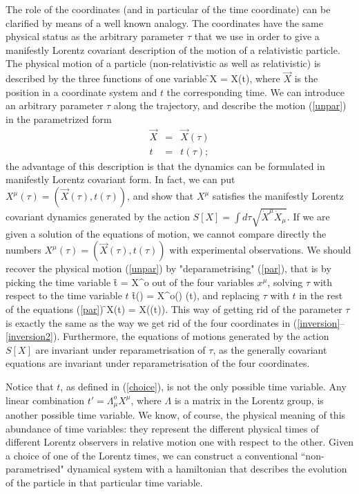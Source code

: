 The role of the coordinates (and in particular of the time
coordinate) can be clarified by means of a well known analogy.
The coordinates have the
same physical status as the arbitrary parameter $\tau$ that we
use in order to give a manifestly Lorentz covariant description of
the motion of a relativistic particle.  The physical motion of a
particle (non-relativistic as well as relativistic) is described by
the three functions of one variable
\f
	\vec X = \vec X(t),				\label{unpar}
\ff
where $\vec X$ is the position in a coordinate system and $t$
the corresponding time.   We can introduce an arbitrary parameter
$\tau$ along the trajectory, and describe the motion (\ref{unpar})
in the parametrized form
\begin{eqnarray}
	\vec X & = & \vec X(\tau)	  		\nonumber \\
	t & = & t(\tau);				\label{par}
\end{eqnarray}
the advantage of this description is that the dynamics can be
formulated in manifestly Lorentz covariant form.  In fact, we can
put $X^\mu(\tau)= (\vec X(\tau), t(\tau))$, and show that $X^\mu$
satisfies the manifestly Lorentz covariant dynamics generated by
the action $S[X]=\int d\tau \sqrt{\dot X^\mu \dot X_\mu}$.   If we
are given a solution of the equations of motion, we cannot
compare directly the numbers $X^\mu(\tau)= (\vec X(\tau),
t(\tau))$ with experimental observations.  We should recover the
physical motion (\ref{unpar}) by "deparametrising" (\ref{par}),
that is by picking the time variable
\f
	t = X^o						\label{choice}
\ff
out of the four variables $x^\mu$, solving $\tau$ with respect to
the time variable $t$
\f
	t(\tau) = X^o(\tau) \rightarrow \tau(t),
\ff
and replacing $\tau$ with $t$ in the rest of the equations
(\ref{par})
\f
	\vec X(t) = \vec X(\tau(t)).
\ff
This way of getting rid of the parameter $\tau$ is exactly the
same as the way we get rid of the four coordinates in
(\ref{inversion}--\ref{inversion2}).   Furthermore, the equations
of motions generated by the action $S[X]$ are invariant under
reparametrisation of $\tau$, as the generally covariant equations
are invariant under reparametrisation of the four coordinates.

Notice that $t$, as defined in (\ref{choice}),  is not the only
possible time variable.  Any linear combination $t' =
\Lambda^o_\mu X^\mu$, where
$\Lambda$ is a matrix in the Lorentz group, is another possible
time variable.  We know, of course,  the physical meaning of
this abundance of time variables: they represent the different
physical times of different Lorentz observers in relative motion
one with respect to the other.  Given a choice of one of the
Lorentz times, we can construct a conventional
``non-parametrised" dynamical system with a hamiltonian that
describes the evolution of the particle in that
particular time variable.

